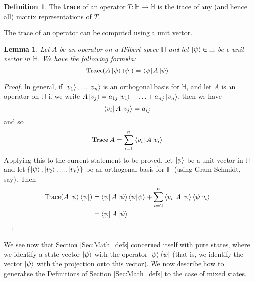 \documentclass[12pt]{article}
\theoremstyle{plain}
\newtheorem{lemma}[thm]{Lemma}
\theoremstyle{definition}
\newtheorem{defn}[thm]{Definition} %
\newcommand{\bb}[1]{\mathbb{#1}}
\newcommand{\lto}{\longrightarrow}
\begin{document}
	\begin{defn}
		The \textbf{trace} of an operator $T: \bb{H} \lto \bb{H}$ is the trace of any (and hence all) matrix representations of $T$.
	\end{defn}
	The trace of an operator can be computed using a unit vector.
	\begin{lemma}\label{lem:trace_evaluation}
		Let $A$ be an operator on a Hilbert space $\bb{H}$ and let $\ket{\psi} \in \bb{H}$ be a unit vector in $\bb{H}$. We have the following formula:
		\begin{equation}
			\operatorname{Trace}(A\ket{\psi}\bra{\psi}) = \bra{\psi}A\ket{\psi}
		\end{equation}
	\end{lemma}
	\begin{proof}
		 In general, if $\ket{v_1},...,\ket{v_n}$ is an orthogonal basis for $\bb{H}$, and let $A$ is an operator on $\bb{H}$ if we write $A\ket{v_j} = a_{1j}\ket{v_1} + \hdots + a_{nj}\ket{v_n}$, then we have
		\begin{equation}
			\bra{v_i}A\ket{v_j} = a_{ij}
		\end{equation}
		and so
		\begin{equation}
			\operatorname{Trace}A = \sum_{i = 1}^n \bra{v_i}A\ket{v_i}
		\end{equation}
	Applying this to the current statement to be proved, let $\ket{\psi}$ be a unit vector in $\bb{H}$ and let $\lbrace \ket{\psi},\ket{v_2},...,\ket{v_n}\rbrace$ be an orthogonal basis for $\bb{H}$ (using Gram-Schmidt, say). Then
		\begin{align*}
			\operatorname{Trace}(A\ket{\psi}\bra{\psi}) &= \bra{\psi}A\ket{\psi}\bra{\psi}\ket{\psi} + \sum_{i = 2}^n \bra{v_i}A\ket{\psi}\bra{\psi}\ket{v_i}\\
			&= \bra{\psi}A\ket{\psi}
		\end{align*}
	\end{proof}
	We see now that Section \ref{Sec:Math_defs} concerned itself with pure states, where we identify a state vector $\ket{\psi}$ with the operator $\ket{\psi}\bra{\psi}$ (that is, we identify the vector $\ket{\psi}$ with the projection onto this vector). We now describe how to generalise the Definitions of Section \ref{Sec:Math_defs} to the case of mixed states.
	
\end{document}
